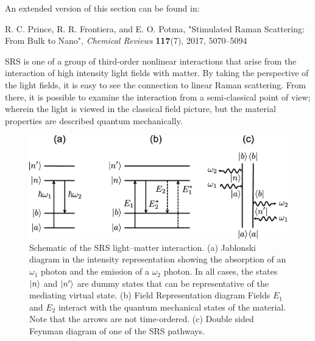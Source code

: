 An extended version of this section can be found in:

R. C. Prince, R. R. Frontiera, and E. O. Potma, "Stimulated Raman Scattering: From Bulk to Nano", \textit{Chemical Reviews} {\bf117}(7), 2017, 5070--5094

SRS is one of a group of third-order nonlinear interactions that arise from the interaction of high intensity light fields with matter.  By taking the perspective of the light fields, it is easy to see the connection to linear Raman scattering.  From there, it is possible to examine the interaction from a semi-classical point of view; wherein the light is viewed in the classical field picture, but the material properties are described quantum mechanically.

\begin{figure}[h]
    \centering
    \includegraphics[width=.9\textwidth]{Figures/jablonski}
    
    \caption{Schematic of the SRS light–matter interaction. (a) Jablonski diagram in the intensity representation showing the absorption of an $\omega_1$ photon and the emission of a $\omega_2$ photon. In all cases, the states $\lvert n\rangle$ and $\lvert n'\rangle$ are dummy states that can be representative of the mediating virtual state. (b) Field Representation diagram Fields $E_1$ and $E_2$ interact with the quantum mechanical states of the material. Note that the arrows are not time-ordered. (c) Double sided Feynman diagram of one of the SRS pathways. \label{fig1}}
    
\end{figure}


